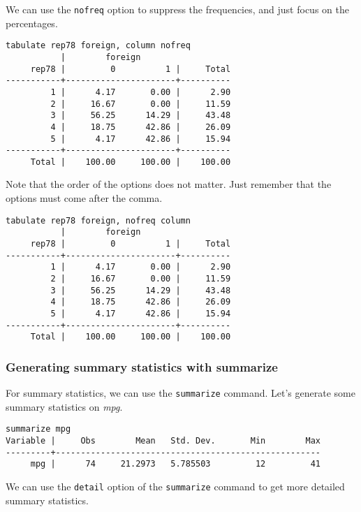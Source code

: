 We can use the \lstinline{nofreq} option to suppress the frequencies, and just focus on the percentages.

\begin{lstlisting}
tabulate rep78 foreign, column nofreq
           |        foreign
     rep78 |         0          1 |     Total
-----------+----------------------+----------
         1 |      4.17       0.00 |      2.90
         2 |     16.67       0.00 |     11.59
         3 |     56.25      14.29 |     43.48
         4 |     18.75      42.86 |     26.09
         5 |      4.17      42.86 |     15.94
-----------+----------------------+----------
     Total |    100.00     100.00 |    100.00
\end{lstlisting}


Note that the order of the options does not matter. Just remember that the options must come after the comma.

\begin{lstlisting}
tabulate rep78 foreign, nofreq column
           |        foreign
     rep78 |         0          1 |     Total
-----------+----------------------+----------
         1 |      4.17       0.00 |      2.90
         2 |     16.67       0.00 |     11.59
         3 |     56.25      14.29 |     43.48
         4 |     18.75      42.86 |     26.09
         5 |      4.17      42.86 |     15.94
-----------+----------------------+----------
     Total |    100.00     100.00 |    100.00
\end{lstlisting}

\subsubsection{Generating summary statistics with summarize}

For summary statistics, we can use the \lstinline{summarize} command. Let's generate some summary statistics on \textit{mpg}.

\begin{lstlisting}
summarize mpg
Variable |     Obs        Mean   Std. Dev.       Min        Max
---------+-----------------------------------------------------
     mpg |      74     21.2973   5.785503         12         41
\end{lstlisting}

We can use the \lstinline{detail} option of the \lstinline{summarize} command to get more detailed summary statistics.

